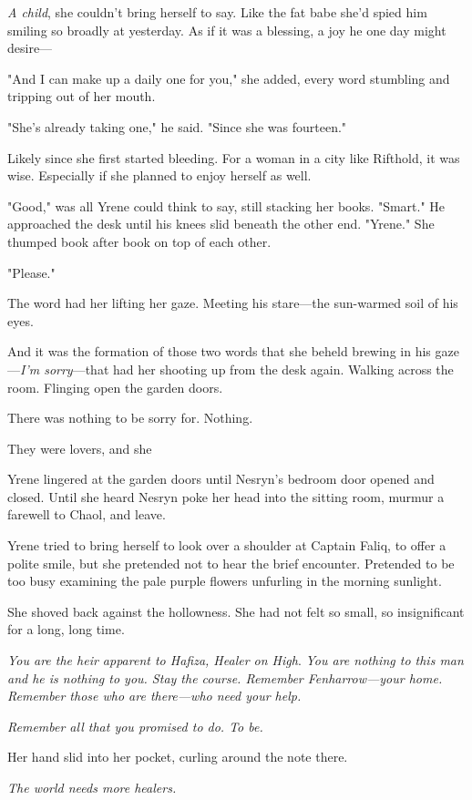 \emph{A child}, she couldn't bring herself to say.
Like the fat babe she'd spied him smiling so broadly at yesterday.
As if it was a blessing, a joy he one day might desire---

"And I can make up a daily one for you," she added, every word stumbling and tripping out of her mouth.

"She's already taking one," he said.
"Since she was fourteen."

Likely since she first started bleeding.
For a woman in a city like Rifthold, it was wise.
Especially if she planned to enjoy herself as well.

"Good," was all Yrene could think to say, still stacking her books.
"Smart."
He approached the desk until his knees slid beneath the other end.
"Yrene."
She thumped book after book on top of each other.

"Please."

The word had her lifting her gaze.
Meeting his stare---the sun-warmed soil of his eyes.

And it was the formation of those two words that she beheld brewing in his gaze---\emph{I'm sorry}---that had her shooting up from the desk again.
Walking across the room.
Flinging open the garden doors.

There was nothing to be sorry for.
Nothing.

They were lovers, and she 

Yrene lingered at the garden doors until Nesryn's bedroom door opened and closed.
Until she heard Nesryn poke her head into the sitting room, murmur a farewell to Chaol, and leave.

Yrene tried to bring herself to look over a shoulder at Captain Faliq, to offer a polite smile, but she pretended not to hear the brief encounter.
Pretended to be too busy examining the pale purple flowers unfurling in the morning sunlight.

She shoved back against the hollowness.
She had not felt so small, so  insignificant for a long, long time.

\emph{You are the heir apparent to Hafiza, Healer on High}.
\emph{You are nothing to this man and he is nothing to you.
Stay the course.
Remember Fenharrow---your home.
Remember those who are there---who need your help.}

\emph{Remember all that you promised to do.
To be.}

Her hand slid into her pocket, curling around the note there.

\emph{The world needs more healers.}

